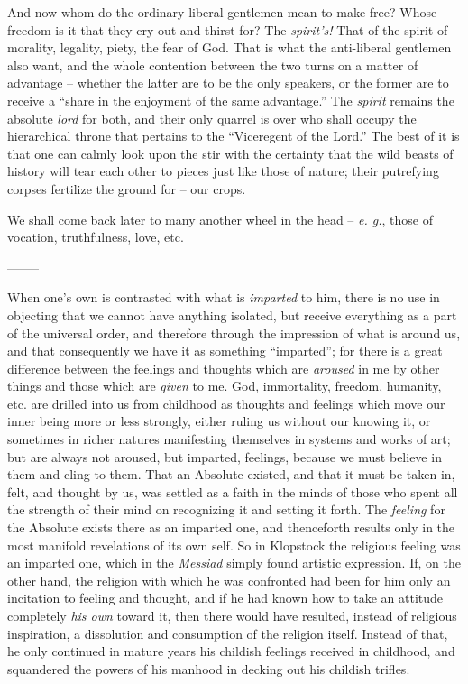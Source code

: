 \documentclass[12pt,a4paper]{book}
\begin{document}
And now whom do the ordinary liberal gentlemen mean to make free? Whose 
freedom is it that they cry out and thirst for? The \textit{spirit's!} That of 
the spirit of morality, legality, piety, the fear of God. That is what the 
anti-liberal gentlemen also want, and the whole contention between the two 
turns on a matter of advantage -- whether the latter are to be the only 
speakers, or the former are to receive a ``share in the enjoyment of the same 
advantage.'' The \textit{spirit} remains the absolute \textit{lord} for both, 
and their only quarrel is over who shall occupy the hierarchical throne that 
pertains to the ``Viceregent of the Lord.'' The best of it is that one can 
calmly look upon the stir with the certainty that the wild beasts of history 
will tear each other to pieces just like those of nature; their putrefying 
corpses fertilize the ground for -- our crops.

We shall come back later to many another wheel in the head -- \textit{e. g.}, 
those of vocation, truthfulness, love, etc.

\begin{center}
--------\end{center}


When one's own is contrasted with what is \textit{imparted} to him, there is 
no use in objecting that we cannot have anything isolated, but receive 
everything as a part of the universal order, and therefore through the 
impression of what is around us, and that consequently we have it as something 
``imparted''; for there is a great difference between the feelings and 
thoughts which are \textit{aroused} in me by other things and those which are 
\textit{given} to me. God, immortality, freedom, humanity, etc. are drilled 
into us from childhood as thoughts and feelings which move our inner being 
more or less strongly, either ruling us without our knowing it, or sometimes 
in richer natures manifesting themselves in systems and works of art; but are 
always not aroused, but imparted, feelings, because we must believe in them 
and cling to them. That an Absolute existed, and that it must be taken in, 
felt, and thought by us, was settled as a faith in the minds of those who 
spent all the strength of their mind on recognizing it and setting it forth. 
The \textit{feeling} for the Absolute exists there as an imparted one, and 
thenceforth results only in the most manifold revelations of its own self. So 
in Klopstock the religious feeling was an imparted one, which in the 
\textit{Messiad} simply found artistic expression. If, on the other hand, the 
religion with which he was confronted had been for him only an incitation to 
feeling and thought, and if he had known how to take an attitude completely 
\textit{his own} toward it, then there would have resulted, instead of 
religious inspiration, a dissolution and consumption of the religion itself. 
Instead of that, he only continued in mature years his childish feelings 
received in childhood, and squandered the powers of his manhood in decking out 
his childish trifles.
\end{document}

